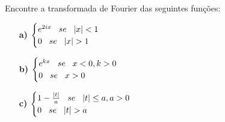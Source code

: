 \linespread{1.5}
Encontre a transformada de Fourier das seguintes funções:

\begin{itemize}
    \item[\textbf{a)}] $\begin{cases} 
    e^{2ix} \hspace{0.3cm} se \hspace{0.3cm}  |x| < 1\\
    0 \hspace{0.3cm} se \hspace{0.3cm}  |x| > 1
    \end{cases}$
    \item[\textbf{b)}] $\begin{cases} 
    e^{kx} \hspace{0.3cm} se \hspace{0.3cm} x < 0, k > 0\\
    0 \hspace{0.3cm} se \hspace{0.3cm} x > 0
    \end{cases}$
    \item[\textbf{c)}] $\begin{cases} 
    1 - \frac{|t|}{a} \hspace{0.3cm} se \hspace{0.3cm} |t| \leq a, a > 0 \\
    0 \hspace{0.3cm} se \hspace{0.3cm} |t| > a
    \end{cases}$
\end{itemize}